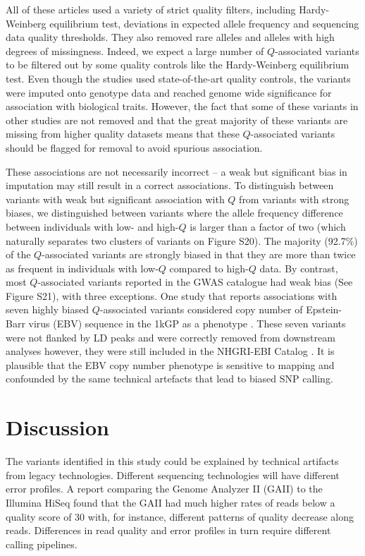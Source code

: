 \documentclass[9pt,article]{template}
\begin{document}
All of these articles used a variety of strict quality filters, including Hardy-Weinberg equilibrium test, deviations in expected allele frequency and sequencing data quality thresholds.
They also removed rare alleles and alleles with high degrees of missingness.
Indeed, we expect a large number of $Q$-associated variants to be filtered out by some quality controls like the Hardy-Weinberg equilibrium test.
Even though the studies used state-of-the-art quality controls, the variants were imputed onto genotype data and reached genome wide significance for association with biological traits.
However, the fact that some of these variants in other studies are not removed and that the great majority of these variants are missing from higher quality datasets means that these $Q$-associated variants should be flagged for removal to avoid spurious association.

These associations are not necessarily incorrect -- a weak but significant bias in imputation may still result in a correct associations.
To distinguish between variants with weak but significant association with $Q$ from variants with strong biases, we distinguished between variants where the allele frequency difference between individuals with low- and high-$Q$ is larger than a factor of two (which naturally separates two clusters of variants on Figure S20). %
The majority (92.7\%) of the $Q$-associated variants are strongly biased in that they are more than twice as frequent in individuals with low-$Q$ compared to high-$Q$ data.
By contrast, most $Q$-associated variants reported in the GWAS catalogue had weak bias (See Figure S21), with three exceptions. %
One study that reports associations with seven highly biased $Q$-associated variants considered copy number of Epstein-Barr virus (EBV) sequence in the 1kGP as a phenotype \citep{Mandage2017}. 
These seven variants were not flanked by LD peaks and were correctly removed from downstream analyses however, they were still included in the NHGRI-EBI Catalog \citep{Mandage2017}.
It is plausible that the EBV copy number phenotype is sensitive to mapping and confounded by the same technical artefacts that lead to biased SNP calling.



\section{Discussion}

The variants identified in this study could be explained by technical artifacts from legacy technologies. %
Different sequencing technologies will have different error profiles. 
A report comparing the Genome Analyzer II (GAII) to the Illumina HiSeq found that the GAII had much higher rates of reads below a quality score of 30 \citep{Minoche2011} with, for instance, different patterns of quality decrease along reads. 
Differences in read quality and error profiles in turn require different calling pipelines.
\end{document}
